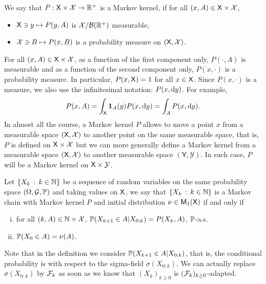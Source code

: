 \documentclass[english,graybox,envcountchap,envcountsame,sectrefs,shortlabels]{svmono}
\theoremstyle{style}
\newcommand{\Yset}{\mathsf{Y}}
\newcommand{\Ysigma}{\mathcal{Y}}
\newcommand{\bs}{\begin{shaded}}
\newcommand{\es}{\end{shaded}}
\newcommand{\eqsp}{}
\begin{document}
\bs
\begin{definition}
We say that $P:\mathsf{X}\times\mathcal{X}\to\mathbb{R}^{+}$
is a Markov kernel, if for all $(x,A)\in\mathsf{X}\times\mathcal{X}$,
\begin{itemize}
\item $\mathsf{X}\ni y\mapsto P(y,A)$ is $\mathcal{X}/\mathcal{B}(\mathbb{R}^{+})$ measurable,
\item $\mathcal{X}\ni B\mapsto P(x,B)$ is a probability measure on $(\mathsf{X},\mathcal{X})$.
\end{itemize}
\end{definition}
\es For all $(x,A)\in\mathsf{X}\times\mathcal{X}$, as a function
of the first component only, $P(\cdot,A)$ is measurable and as a
function of the second component only, $P(x,\cdot)$ is a probability
measure. In particular, $P(x,\mathsf{X})=1$ for all $x\in\mathsf{X}$. Since
$P(x,\cdot)$ is a measure, we also use the infinitesimal notation:
$P(x,\mathrm{d} y)$. For example, 
$$
P(x,A)=\int_{\Xset}\indi A(y)P(x,\rmd y)=\int_{A}P(x,\rmd y)\eqsp.
$$
In almost all the course, a Markov kernel $P$ allows to move a point $x$ from a measurable space $(\mathsf{X},\mathcal{X})$ to another point on the same measurable space, that is, $P$ is defined on $\mathsf{X}\times \mathcal{X}$ but we can more generally define a Markov kernel from a measurable space $(\mathsf{X},\mathcal{X})$ to another measurable space $(\Yset,\Ysigma)$. In such case, $P$ will be a  Markov kernel on $\Xset \times \Ysigma$. 
\begin{definition}
\label{def:MarkovChain} Let $\left\{ X_{k}\,:\,k\in\mathbb{N}\right\}$
be a sequence of random variables on the same probability space $(\Omega,\mathcal{G},\mathbb{P})$
and taking values on $\mathsf{X}$, we say that $\left\{ X_{k}\,:\,k\in\mathbb{N}\right\}$
is a Markov chain with Markov kernel $P$ and initial distribution
$\nu\in\mathsf{M}_{1}(\mathsf{X})$ if and only if
\begin{enumerate}[(i)]
\item  for all $(k,A)\in\mathbb{N}\times\mathcal{X}$,  $\mathbb{P}(X_{k+1}\in A|X_{0:k})=P(X_{k},A)$,
$\mathbb{P}$-a.s.
\item $\mathbb{P}(X_{0}\in A)=\nu(A)$.
\end{enumerate}
\end{definition}
Note that in the definition we consider $\mathbb{P}(X_{k+1}\in A|X_{0:k})$,
that is, the conditional probability is with respect to the sigma-field
$\sigma(X_{0:k})$. We can actually replace $\sigma(X_{0:k})$ by
$\mathcal{F}_{k}$ as soon as we know that $(X_{k})_{k\geq0}$ is $(\mathcal{F}_{k})_{k\geq0}$-adapted.
\end{document}

